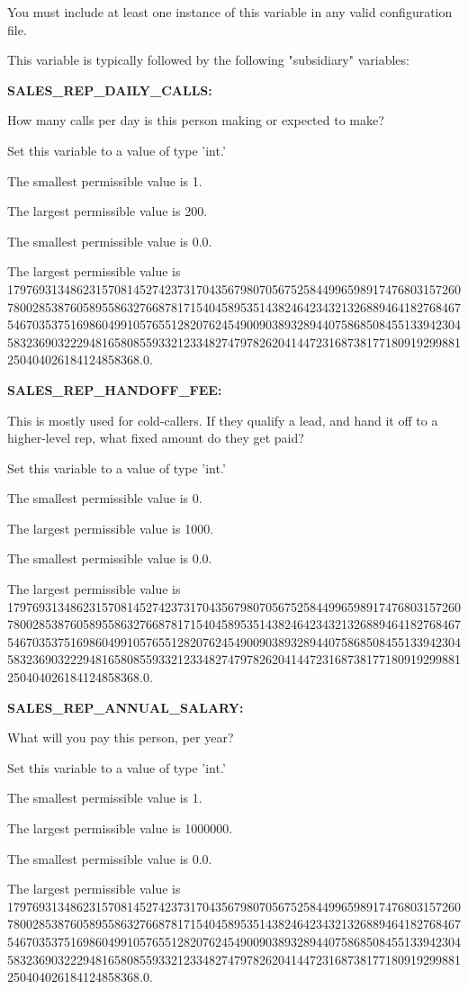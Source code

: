 You must include at least one instance of this variable in any valid configuration file.

This variable is typically followed by the following "subsidiary" variables:


\textbf{SALES\_REP\_DAILY\_CALLS:}


How many calls per day is this person making or expected to make?

Set this variable to a value of type 'int.'

The smallest permissible value is 1.

The largest permissible value is 200.

The smallest permissible value is 0.0.

The largest permissible value is 179769313486231570814527423731704356798070567525844996598917476803157260780028538760589558632766878171540458953514382464234321326889464182768467546703537516986049910576551282076245490090389328944075868508455133942304583236903222948165808559332123348274797826204144723168738177180919299881250404026184124858368.0.


\textbf{SALES\_REP\_HANDOFF\_FEE:}


This is mostly used for cold-callers.  If they qualify a lead, and hand it off to a higher-level rep, what fixed amount do they get paid?

Set this variable to a value of type 'int.'

The smallest permissible value is 0.

The largest permissible value is 1000.

The smallest permissible value is 0.0.

The largest permissible value is 179769313486231570814527423731704356798070567525844996598917476803157260780028538760589558632766878171540458953514382464234321326889464182768467546703537516986049910576551282076245490090389328944075868508455133942304583236903222948165808559332123348274797826204144723168738177180919299881250404026184124858368.0.


\textbf{SALES\_REP\_ANNUAL\_SALARY:}


What will you pay this person, per year?

Set this variable to a value of type 'int.'

The smallest permissible value is 1.

The largest permissible value is 1000000.

The smallest permissible value is 0.0.

The largest permissible value is 179769313486231570814527423731704356798070567525844996598917476803157260780028538760589558632766878171540458953514382464234321326889464182768467546703537516986049910576551282076245490090389328944075868508455133942304583236903222948165808559332123348274797826204144723168738177180919299881250404026184124858368.0.


